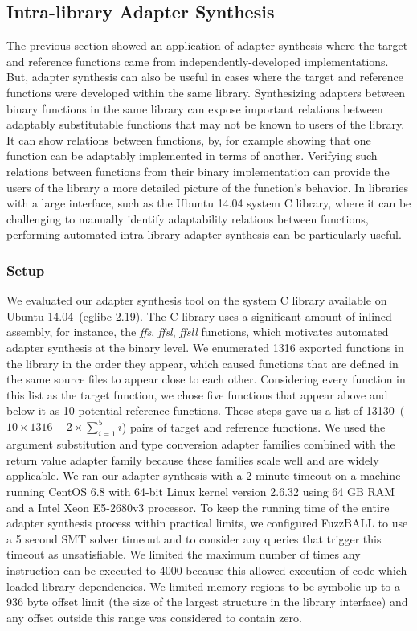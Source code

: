 \subsection{Intra-library Adapter Synthesis}
\label{subsec:c-library-evaluation}
%
The previous section showed an application of adapter synthesis where the target and reference functions came from
independently-developed implementations.
%
But, adapter synthesis can also be useful in cases where the target and reference functions were developed within the same
library.
%
Synthesizing adapters between binary functions in the same library can expose important relations between adaptably
substitutable functions that may not be known to users of the library.
%
It can show relations between functions, by, for example showing that one function can be adaptably
implemented in terms of another.
%
Verifying such relations between functions from their binary implementation can provide the users of the library a
more detailed picture of the function\rq s behavior.
%
In libraries with a large interface, such as the Ubuntu 14.04 system C library, where it can be challenging to manually identify
adaptability relations between functions, performing automated intra-library adapter synthesis can be particularly
useful.
%
\subsubsection{Setup}
%
We evaluated our adapter synthesis tool on the system C library available on Ubuntu 14.04~(eglibc 2.19).
%
The C library uses a significant amount of inlined assembly, for instance, the \textit{ffs}, \textit{ffsl}, \textit{ffsll} functions, which
motivates automated adapter synthesis at the binary level.
%
We enumerated 1316 exported functions in the library in the order they
appear, which caused functions that are defined in the same source files
to appear close to each other.
%
Considering every function in this list as the target function, we chose five functions that appear above and below it as 10 potential reference functions.
%
These steps gave us a list of 13130~($10\times 1316 - 2 \times \sum_{i=1}^5 i$) pairs of target and reference functions.
%
We used the argument substitution and type conversion adapter families combined with the return value adapter family because these families scale well and are widely applicable.
%
We ran our adapter synthesis with a 2 minute timeout on a machine running CentOS 6.8 with 64-bit Linux kernel version 2.6.32 using 64 GB RAM and a Intel Xeon E5-2680v3 processor.
%
To keep the running time of the entire adapter synthesis process within practical limits, we configured FuzzBALL to use a 5 second SMT solver timeout and to consider any queries that trigger this timeout as unsatisfiable.
%
We limited the maximum number of times any instruction can be executed to 4000 because this allowed execution of code which loaded library dependencies.
%
We limited memory regions to be symbolic up to a 936 byte offset limit (the size of the largest structure in the library interface) and any offset outside this range was considered to contain zero.
%
